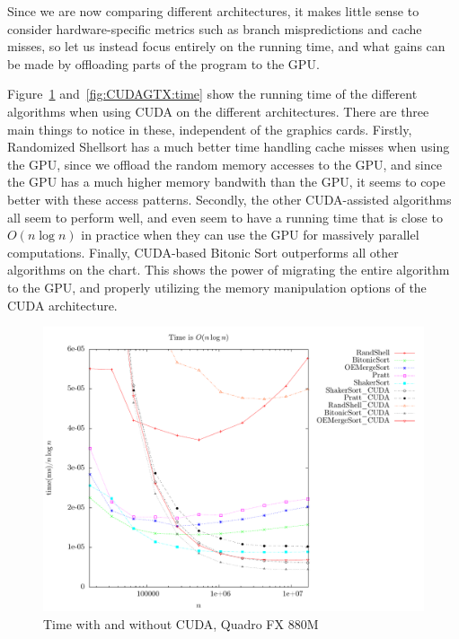 Since we are now comparing different architectures, it makes little sense to consider hardware-specific metrics such as branch mispredictions and cache misses, so let us instead focus entirely on the running time, and what gains can be made by offloading parts of the program to the GPU.

Figure~\ref{fig:CUDAQuadro:time} and~\ref{fig:CUDAGTX:time} show the running time of the different algorithms when using CUDA on the different architectures.
There are three main things to notice in these, independent of the graphics cards. Firstly, Randomized Shellsort has a much better time handling cache misses when using the GPU, since we offload the random memory accesses to the GPU, and since the GPU has a much higher memory bandwith than the GPU, it seems to cope better with these access patterns.
Secondly, the other CUDA-assisted algorithms all seem to perform well, and even seem to have a running time that is close to $O(n \log n)$ in practice when they can use the GPU for massively parallel computations.
Finally, CUDA-based Bitonic Sort outperforms all other algorithms on the chart. This shows the power of migrating the entire algorithm to the GPU, and properly utilizing the memory manipulation options of the CUDA architecture.

\begin{figure}
\center
\includegraphics[width=\textwidth]{graphs/CUDA/nlogntime.pdf}
\caption{Time with and without CUDA, Quadro FX 880M}
\label{fig:CUDAQuadro:time}
\end{figure}


